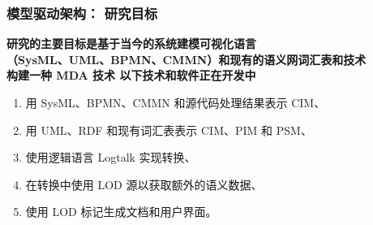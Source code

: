 \documentclass[10pt]{beamer}
\begin{document}
\begin{frame}
  \frametitle{模型驱动架构： 研究目标}
  \textbf{研究的主要目标是基于当今的系统建模可视化语言\\（SysML、UML、BPMN、CMMN）和现有的语义网词汇表和技术\\ 构建一种 MDA 技术 以下技术和软件正在开发中}
  \begin{enumerate}
  \item 用 SysML、BPMN、CMMN 和源代码处理结果表示 CIM、
  \item  用 UML、RDF 和现有词汇表表示 CIM、PIM 和 PSM、
  \item 使用逻辑语言 Logtalk 实现转换、
  \item  在转换中使用 LOD 源以获取额外的语义数据、
  \item  使用 LOD 标记生成文档和用户界面。
  \end{enumerate}
\end{frame}
\end{document}

